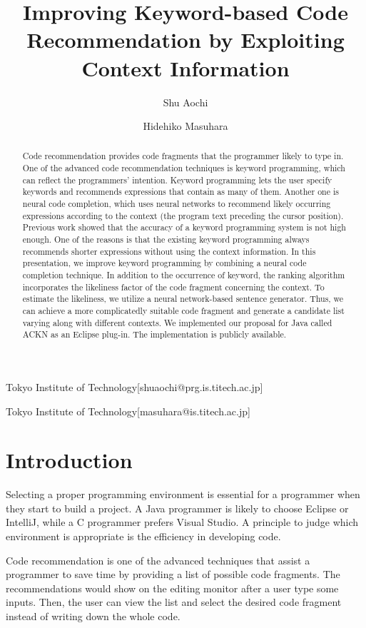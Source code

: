 \documentclass[PRO,english]{ipsj}
\begin{document}
\title{Improving Keyword-based Code Recommendation by Exploiting Context Information}
\author{Shu Aochi}{Tokyo Institute of Technology}[shuaochi@prg.is.titech.ac.jp]
\author{Hidehiko Masuhara}{Tokyo Institute of Technology}[masuhara@is.titech.ac.jp]

\begin{abstract}
Code recommendation provides code fragments that the programmer likely to type in. One of the advanced code recommendation techniques is keyword programming, which can reflect the programmers' intention. Keyword programming lets the user specify keywords and recommends expressions that contain as many of them. Another one is neural code completion, which uses neural networks to recommend likely occurring expressions according to the context (the program text preceding the cursor position). Previous work showed that the accuracy of a keyword programming system is not high enough. One of the reasons is that the existing keyword programming always recommends shorter expressions without using the context information. In this presentation, we improve keyword programming by combining a neural code completion technique. In addition to the occurrence of keyword, the ranking algorithm incorporates the likeliness factor of the code fragment concerning the context. To estimate the likeliness, we utilize a neural network-based sentence generator. Thus, we can achieve a more complicatedly suitable code fragment and generate a candidate list varying along with different contexts. We implemented our proposal for Java called ACKN as an Eclipse plug-in. The implementation is publicly available.
\end{abstract}

\maketitle

\section{Introduction}
Selecting a proper programming environment is essential for a programmer when they start to build a project. A Java programmer is likely to choose Eclipse or IntelliJ, while a C programmer prefers Visual Studio. A principle to judge which environment is appropriate is the efficiency in developing code.

Code recommendation is one of the advanced techniques that assist a programmer to save time by providing a list of possible code fragments. The recommendations would show on the editing monitor after a user type some inputs. Then, the user can view the list and select the desired code fragment instead of writing down the whole code.  
\end{document}
